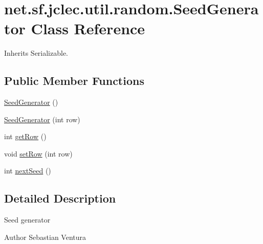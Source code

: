 \hypertarget{classnet_1_1sf_1_1jclec_1_1util_1_1random_1_1_seed_generator}{\section{net.\-sf.\-jclec.\-util.\-random.\-Seed\-Generator Class Reference}
\label{classnet_1_1sf_1_1jclec_1_1util_1_1random_1_1_seed_generator}
}


Inherits Serializable.

\subsection*{Public Member Functions}
\begin{DoxyCompactItemize}
\item 
\hyperlink{classnet_1_1sf_1_1jclec_1_1util_1_1random_1_1_seed_generator_aefc4c873fbc77018b0c464a7575a9230}{Seed\-Generator} ()
\item 
\hyperlink{classnet_1_1sf_1_1jclec_1_1util_1_1random_1_1_seed_generator_a867bd239576edd98f027cb73e907a526}{Seed\-Generator} (int row)
\item 
int \hyperlink{classnet_1_1sf_1_1jclec_1_1util_1_1random_1_1_seed_generator_ae6aaec90392dea8e45107fa97e5acc66}{get\-Row} ()
\item 
void \hyperlink{classnet_1_1sf_1_1jclec_1_1util_1_1random_1_1_seed_generator_a8c7fe56cfa9e0374729b2b4dde7bf0ce}{set\-Row} (int row)
\item 
int \hyperlink{classnet_1_1sf_1_1jclec_1_1util_1_1random_1_1_seed_generator_ac1e09c5621f1e4b35576a0fd6bbfca3e}{next\-Seed} ()
\end{DoxyCompactItemize}


\subsection{Detailed Description}
Seed generator

\begin{DoxyAuthor}{Author}
Sebastian Ventura 
\end{DoxyAuthor}


